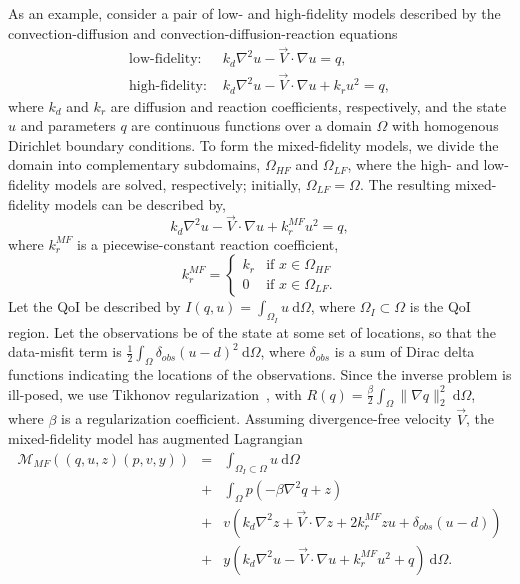 As an example, consider a pair of low- and high-fidelity models described by the convection-diffusion and convection-diffusion-reaction equations
\begin{subequations}
\begin{align}
\textrm{low-fidelity:   } & k_d\nabla^2 u - \vec{V}\cdot\nabla u = q, \label{eq:cdvcdrLF}\\
\textrm{high-fidelity:   } & k_d\nabla^2 u - \vec{V}\cdot\nabla u + k_ru^2 = q, \label{eq:cdvcdrHF}
\end{align}
\end{subequations}
where $k_d$ and $k_r$ are diffusion and reaction coefficients, respectively, and the state $u$ and parameters $q$ are continuous functions over a domain $\Omega$ with homogenous Dirichlet boundary conditions. To form the mixed-fidelity models, we divide the domain into complementary subdomains, $\Omega_{HF}$ and $\Omega_{LF}$, where the high- and low-fidelity models are solved, respectively; initially, $\Omega_{LF}=\Omega$. The resulting mixed-fidelity models can be described by,
%
\begin{equation}
k_d\nabla^2 u - \vec{V}\cdot\nabla u + k^{MF}_ru^2= q,
\end{equation}
%
where $k^{MF}_r$ is a piecewise-constant reaction coefficient, %
%
\begin{equation}
k^{MF}_r=
\begin{cases}
k_r & \textrm{if }x\in\Omega_{HF} \\
0 & \textrm{if }x\in\Omega_{LF}.
\end{cases}
\end{equation}
%
Let the QoI be described by $I(q,u)=\int_{\Omega_I} u \:\textrm{d}\Omega$, where $\Omega_I\subset\Omega$ is the QoI region. Let the observations be of the state at some set of locations, so that the data-misfit term is $\frac{1}{2}\int_\Omega \delta_{obs}(u-d)^2\:\textrm{d}\Omega$, where $\delta_{obs}$ is a sum of Dirac delta functions indicating the locations of the observations. Since the inverse problem is ill-posed, we use Tikhonov regularization~\cite{EngHanNeu00}, with $R(q)=\frac{\beta}{2}\int_\Omega \|\nabla q\|_2^2\:\textrm{d}\Omega$, where $\beta$ is a regularization coefficient. Assuming divergence-free velocity $\vec{V}$, the mixed-fidelity model has augmented Lagrangian
\begin{eqnarray}
\mathcal{M}_{MF}((q,u,z)(p,v,y)) &=& \int_{\Omega_I\subset\Omega} u \:\textrm{d}\Omega \nonumber\\
&+& \int_\Omega p(-\beta\nabla^2q+z) \nonumber\\
&+& v(k_d\nabla^2z+\vec{V}\cdot\nabla z+2k^{MF}_rzu+\delta_{obs}(u-d)) \nonumber\\ 
&+& y(k_d\nabla^2u-\vec{V}\cdot\nabla u+k^{MF}_ru^2+q)\:\textrm{d}\Omega.
\end{eqnarray}
